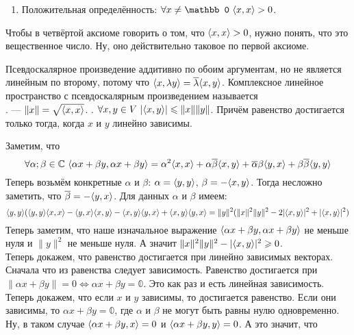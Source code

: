 \documentclass{article}
\begin{document}
\begin{itemize}
\begin{enumerate}
            \item Положительная определённость: $\forall x\neq\mathbb0~\dotprod{x}{x}>0$.
        \end{enumerate}
        \begin{Comment}
            Чтобы в четвёртой аксиоме говорить о том, что ${\left\langle{x},{x}\right\rangle}>0$, нужно понять, что это вещественное число. Ну, оно действительно таковое по первой аксиоме.
        \end{Comment}
        \thm Псевдоскалярное произведение аддитивно по обоим аргументам, но не является линейным по второму, потому что ${\left\langle{x},{\lambda y}\right\rangle}=\overline\lambda{\left\langle{x},{y}\right\rangle}$.
        \dfn Комплексное линейное пространство с псевдоскалярным произведением называется\\
        .
        \dfn {} --- $\|x\|=\sqrt{{\left\langle{x},{x}\right\rangle}}$.
        \thm {}. $\forall x,y\in V~|{\left\langle{x},{y}\right\rangle}|\leqslant\|x\|\|y\|$. Причём равенство достигается только тогда, когда $x$ и $y$ линейно зависимы.
        \begin{Proof}
            Заметим, что
            $$\forall\alpha;\beta\in\mathbb C~{\left\langle{\alpha x+\beta y},{\alpha x+\beta y}\right\rangle}=\alpha^2{\left\langle{x},{x}\right\rangle}+\alpha\overline\beta{\left\langle{x},{y}\right\rangle}+\overline\alpha\beta{\left\langle{y},{x}\right\rangle}+\beta\overline\beta{\left\langle{y},{y}\right\rangle}$$
            Теперь возьмём конкретные $\alpha$ и $\beta$: $\alpha={\left\langle{y},{y}\right\rangle}$, $\beta=-{\left\langle{x},{y}\right\rangle}$. Тогда несложно заметить, что $\overline\beta=-{\left\langle{y},{x}\right\rangle}$. Для данных $\alpha$ и $\beta$ имеем:
            $${\left\langle{y},{y}\right\rangle}({\left\langle{y},{y}\right\rangle}{\left\langle{x},{x}\right\rangle}-{\left\langle{y},{x}\right\rangle}{\left\langle{x},{y}\right\rangle}-{\left\langle{x},{y}\right\rangle}{\left\langle{y},{x}\right\rangle}+{\left\langle{x},{y}\right\rangle}{\left\langle{y},{x}\right\rangle}=\|y\|^2(\|x\|^2\|y\|^2-2|{\left\langle{x},{y}\right\rangle}|^2+|{\left\langle{x},{y}\right\rangle}|^2)$$
            Теперь заметим, что наше изначальное выражение ${\left\langle{\alpha x+\beta y},{\alpha x+\beta y}\right\rangle}$ не меньше нуля и $\|y\|^2$ не меньше нуля. А значит $\|x\|^2\|y\|^2-|{\left\langle{x},{y}\right\rangle}|^2\geqslant0$.\\
            Теперь докажем, что равенство достигается при линейно зависимых векторах. Сначала что из равенства следует зависимость. Равенство достигается при $\|\alpha x+\beta y\|=0\Leftrightarrow\alpha x+\beta y=\mathbb0$. Это как раз и есть линейная зависимость.\\
            Теперь докажем, что если $x$ и $y$ зависимы, то достигается равенство. Если они зависимы, то $\alpha x+\beta y=\mathbb0$, где $\alpha$ и $\beta$ не могут быть равны нулю одновременно. Ну, в таком случае ${\left\langle{\alpha x+\beta y},{x}\right\rangle}=0$ и ${\left\langle{\alpha x+\beta y},{y}\right\rangle}=0$. А это значит, что

\end{Proof}
\end{itemize}
\end{document}
